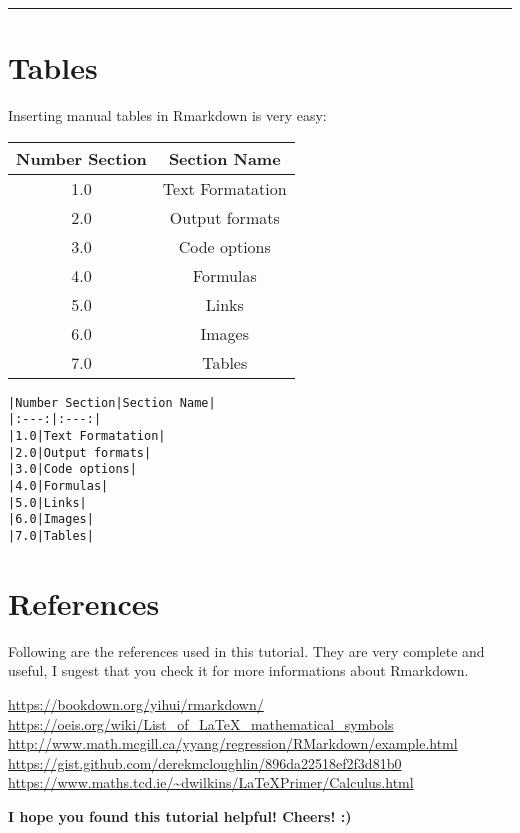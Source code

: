 \documentclass[]{article}
\begin{document}
\begin{center}\rule{0.5\linewidth}{\linethickness}\end{center}

\section{Tables}\label{tables}

Inserting manual tables in Rmarkdown is very easy:

\begin{longtable}[]{@{}cc@{}}
\toprule
Number Section & Section Name\tabularnewline
\midrule
\endhead
1.0 & Text Formatation\tabularnewline
2.0 & Output formats\tabularnewline
3.0 & Code options\tabularnewline
4.0 & Formulas\tabularnewline
5.0 & Links\tabularnewline
6.0 & Images\tabularnewline
7.0 & Tables\tabularnewline
\bottomrule
\end{longtable}

\begin{verbatim}
|Number Section|Section Name|
|:---:|:---:|
|1.0|Text Formatation|
|2.0|Output formats|
|3.0|Code options|
|4.0|Formulas|
|5.0|Links|
|6.0|Images|
|7.0|Tables|
\end{verbatim}

\section{References}\label{references}

Following are the references used in this tutorial. They are very
complete and useful, I sugest that you check it for more informations
about Rmarkdown.

\url{https://bookdown.org/yihui/rmarkdown/}
\url{https://oeis.org/wiki/List_of_LaTeX_mathematical_symbols}
\url{http://www.math.mcgill.ca/yyang/regression/RMarkdown/example.html}
\url{https://gist.github.com/derekmcloughlin/896da22518ef2f3d81b0}
\url{https://www.maths.tcd.ie/~dwilkins/LaTeXPrimer/Calculus.html}

\textbf{I hope you found this tutorial helpful! Cheers! :)}
\end{document}
